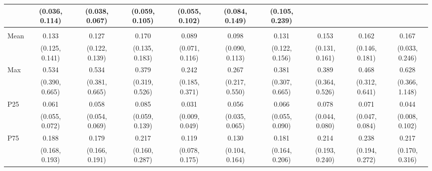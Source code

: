 {\begin{tabular}{l|c|c|c|c|c|c|c|c|c}
& {\scriptsize (0.036, 0.114)}
& {\scriptsize (0.038, 0.067)}
& {\scriptsize (0.059, 0.105)}
& {\scriptsize (0.055, 0.102)}
& {\scriptsize (0.084, 0.149)}
& {\scriptsize (0.105, 0.239)}
\\ [0.1cm]
\hline
\noalign{\smallskip}
\multicolumn{10}{l}{\textbf{Effect with Leads and Lags}} \\
\noalign{\smallskip}
\hline
Mean
& 0.133 & 0.127 & 0.170 & 0.089 & 0.098 & 0.131 & 0.153 & 0.162 & 0.167 \\
& {\scriptsize (0.125, 0.141)}
& {\scriptsize (0.122, 0.139)}
& {\scriptsize (0.135, 0.183)}
& {\scriptsize (0.071, 0.116)}
& {\scriptsize (0.090, 0.113)}
& {\scriptsize (0.122, 0.156)}
& {\scriptsize (0.131, 0.161)}
& {\scriptsize (0.146, 0.181)}
& {\scriptsize (0.033, 0.246)}
\\ [0.1cm]
\hline
Max
& 0.534 & 0.534 & 0.379 & 0.242 & 0.267 & 0.381 & 0.389 & 0.468 & 0.628 \\
& {\scriptsize (0.390, 0.665)}
& {\scriptsize (0.381, 0.665)}
& {\scriptsize (0.319, 0.526)}
& {\scriptsize (0.185, 0.371)}
& {\scriptsize (0.217, 0.550)}
& {\scriptsize (0.307, 0.665)}
& {\scriptsize (0.364, 0.526)}
& {\scriptsize (0.312, 0.641)}
& {\scriptsize (0.366, 1.148)}
\\ [0.1cm]
\hline
P25
& 0.061 & 0.058 & 0.085 & 0.031 & 0.056 & 0.066 & 0.078 & 0.071 & 0.044 \\
& {\scriptsize (0.055, 0.072)}
& {\scriptsize (0.054, 0.069)}
& {\scriptsize (0.059, 0.139)}
& {\scriptsize (0.009, 0.049)}
& {\scriptsize (0.035, 0.065)}
& {\scriptsize (0.055, 0.090)}
& {\scriptsize (0.044, 0.080)}
& {\scriptsize (0.047, 0.084)}
& {\scriptsize (0.008, 0.102)}
\\ [0.1cm]
\hline
P75
& 0.188 & 0.179 & 0.217 & 0.119 & 0.130 & 0.181 & 0.214 & 0.238 & 0.217 \\
& {\scriptsize (0.168, 0.193)}
& {\scriptsize (0.166, 0.191)}
& {\scriptsize (0.160, 0.287)}
& {\scriptsize (0.078, 0.175)}
& {\scriptsize (0.104, 0.164)}
& {\scriptsize (0.164, 0.206)}
& {\scriptsize (0.193, 0.240)}
& {\scriptsize (0.194, 0.272)}
& {\scriptsize (0.170, 0.316)}
\\ [0.1cm]
\hline
\hline
\end{tabular}
}
